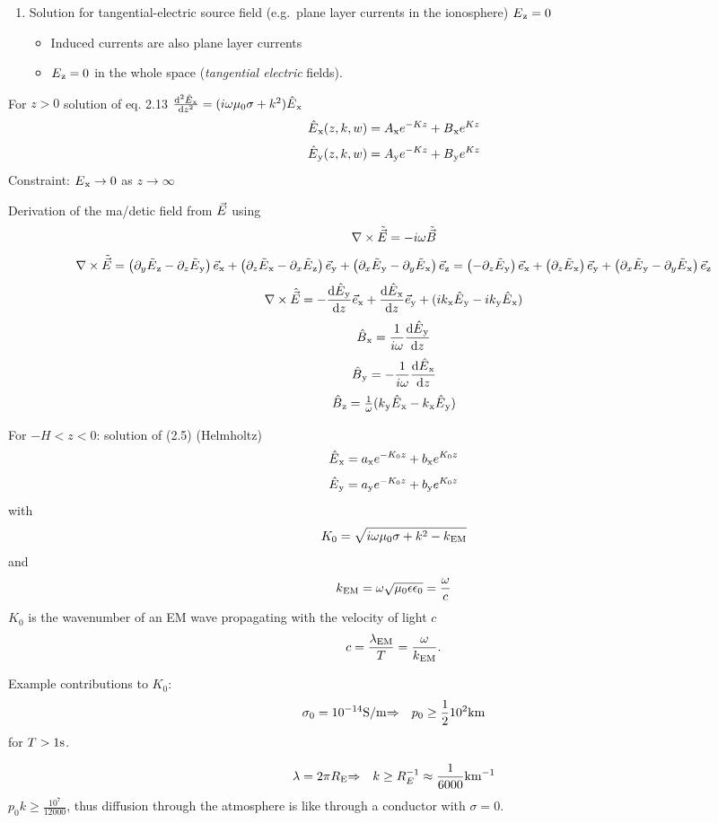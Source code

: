 \begin{enumerate}
\def\labelenumi{\arabic{enumi}.}
\tightlist
\item
  Solution for tangential-electric source field (e.g.~plane layer
  currents in the ionosphere) \(E\text{$_{\mathrm{z}}$}=0\)

  \begin{itemize}
  \tightlist
  \item
    Induced currents are also plane layer currents
  \item
    \(E\text{$_{\mathrm{z}}$} = 0\) in the whole space (\emph{tangential electric}
    fields).
  \end{itemize}
\end{enumerate}

For \(z>0\) solution of eq. 2.13
\(\frac{\mathrm{d}^2\hat{E}\text{$_{\mathrm{x}}$}}{\mathrm{d} z^2} = (i\omega\mu_0\sigma + k^2)\hat{E}\text{$_{\mathrm{x}}$}\)
\[
  \hat{E}\text{$_{\mathrm{x}}$}(z,k,w) = A\text{$_{\mathrm{x}}$} e^{-Kz} + B\text{$_{\mathrm{x}}$}e^{Kz}
\] \[
  \hat{E}\text{$_{\mathrm{y}}$}(z,k,w) = A\text{$_{\mathrm{y}}$} e^{-Kz} + B\text{$_{\mathrm{y}}$}e^{Kz}
\] Constraint: \(E\text{$_{\mathrm{x}}$}\to 0\) as \(z \to\infty\)

Derivation of the ma/detic field from \(\vec{E}\) using \[
  \nabla\times\tilde{\vec{E}} = -i\omega\tilde{\vec{B}}
\] \[
  \nabla\times\tilde{\vec{E}}
    = \left( \partial_y\tilde E\text{$_{\mathrm{z}}$} - \partial_z \tilde E\text{$_{\mathrm{y}}$} \right) \vec{e}\text{$_{\mathrm{x}}$}
    + \left( \partial_z\tilde E\text{$_{\mathrm{x}}$} - \partial_x \tilde E\text{$_{\mathrm{z}}$} \right) \vec{e}\text{$_{\mathrm{y}}$}
    + \left( \partial_x\tilde E\text{$_{\mathrm{y}}$} - \partial_y \tilde E\text{$_{\mathrm{x}}$} \right) \vec{e}\text{$_{\mathrm{z}}$}
    = \left( - \partial_z \tilde E\text{$_{\mathrm{y}}$} \right) \vec{e}\text{$_{\mathrm{x}}$}
    + \left( \partial_z\tilde E\text{$_{\mathrm{x}}$}  \right) \vec{e}\text{$_{\mathrm{y}}$}
    + \left( \partial_x\tilde E\text{$_{\mathrm{y}}$} - \partial_y \tilde E\text{$_{\mathrm{x}}$} \right) \vec{e}\text{$_{\mathrm{z}}$}
\] \[
  \nabla\times\hat{\vec{E}}
     = -\frac{\mathrm{d}\hat E\text{$_{\mathrm{y}}$}}{\mathrm{d} z}\vec{e}\text{$_{\mathrm{x}}$}
       + \frac{\mathrm{d}\hat E\text{$_{\mathrm{x}}$}}{\mathrm{d} z}\vec{e}\text{$_{\mathrm{y}}$}
       + (ik\text{$_{\mathrm{x}}$} \hat E\text{$_{\mathrm{y}}$} - ik\text{$_{\mathrm{y}}$}\hat E\text{$_{\mathrm{x}}$})
\] \setcounter{equation}{15}\[
  \hat B\text{$_{\mathrm{x}}$} = \frac{1}{i\omega}\frac{\mathrm{d}\hat E\text{$_{\mathrm{y}}$}}{\mathrm{d} z}
\] \[
  \hat B\text{$_{\mathrm{y}}$} = -\frac{1}{i\omega}\frac{\mathrm{d}\hat E\text{$_{\mathrm{x}}$}}{\mathrm{d} z}
\] \[
  \hat B\text{$_{\mathrm{z}}$} = \tfrac1\omega (k\text{$_{\mathrm{y}}$}\hat E\text{$_{\mathrm{x}}$} - k\text{$_{\mathrm{x}}$}\hat E\text{$_{\mathrm{y}}$})
\]

For \(-H < z < 0\): solution of (2.5) (Helmholtz) \[
  \hat E\text{$_{\mathrm{x}}$} = a\text{$_{\mathrm{x}}$} e^{-K_0 z} + b\text{$_{\mathrm{x}}$} e^{K_0 z}
\] \[
  \hat E\text{$_{\mathrm{y}}$} = a\text{$_{\mathrm{y}}$} e^{-K_0 z} + b\text{$_{\mathrm{y}}$} e^{K_0 z}
\] with \[
  K_0 = \sqrt{i\omega\mu_0\sigma + k^2 - k\text{$_{\mathrm{EM}}$}}
\] and \setcounter{equation}{16}\[
  k\text{$_{\mathrm{EM}}$} = \omega\sqrt{\mu_0\epsilon\epsilon_0} = \frac{\omega}{c}
\] \(K_0\) is the wavenumber of an EM wave propagating with the velocity
of light \(c\) \[
  c = \frac{\lambda\text{$_{\mathrm{EM}}$}}{T} = \frac{\omega}{k\text{$_{\mathrm{EM}}$}}.
\]

Example contributions to \(K_0\): \[
  \sigma_0 = 10^{-14}\mathrm{S/m} {\Rightarrow\quad} p_0 \geq \frac12 10^2\mathrm{km}
\] for \(T>1\mathrm{s}\).

\[
  \lambda = 2\pi R\text{$_{\mathrm{E}}$} {\Rightarrow\quad} k\geq R_E^{-1} \approx \frac1{6000}\mathrm{km^{-1}}
\] \(p_0k \geq \frac{10^7}{12000}\), thus diffusion through the
atmosphere is like through a conductor with \(\sigma = 0\).
